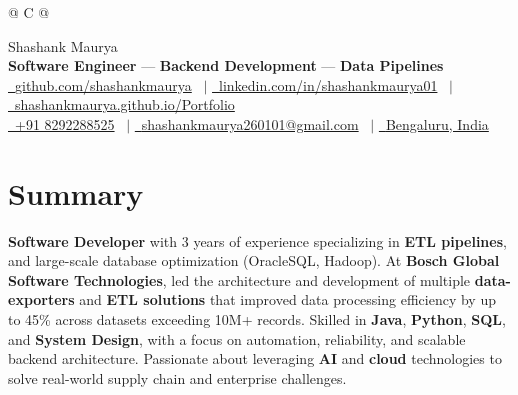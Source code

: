 \documentclass[a4paper,10pt]{article}
\begin{document}
\pagestyle{empty}


\begin{tabularx}{\linewidth}{@{} C @{}}

    \Huge{Shashank Maurya}                                                                                                   \\[4.5pt]
    \large\textbf{Software Engineer} --- \textbf{Backend Development} --- \textbf{Data Pipelines}                      \\[7.5pt]

    \href{https://github.com/shashankmaurya}{\faGithub\ \textcolor{linkcolour}{github.com/shashankmaurya}} \ $|$
    \href{https://www.linkedin.com/in/shashankmaurya01/}{\faLinkedin\ \textcolor{linkcolour}{linkedin.com/in/shashankmaurya01}} \ $|$
    \href{https://shashankmaurya.github.io/Portfolio/}{\faGlobe\ \textcolor{linkcolour}{shashankmaurya.github.io/Portfolio}} \\[2pt]
    \href{tel:8292288525}{\faMobile \ \textcolor{linkcolour}{+91 8292288525}} \ $|$
    \href{mailto:shashankmaurya260101@gmail.com}{\faEnvelope \ \textcolor{linkcolour}{shashankmaurya260101@gmail.com}} \ $|$
    \href{https://maps.app.goo.gl/1jdNXAY2RCsecJSLA}{\faMapMarker\ \textcolor{linkcolour}{Bengaluru, India}}                 \\
\end{tabularx}

\section{Summary}
\noindent\textbf{Software Developer} with 3 years of experience specializing in \textbf{ETL pipelines}, and large-scale database optimization (OracleSQL, Hadoop). At \textbf{Bosch Global Software Technologies}, led the architecture and development of multiple \textbf{data-exporters} and \textbf{ETL solutions} that improved data processing efficiency by up to 45\% across datasets exceeding 10M+ records. Skilled in \textbf{Java}, \textbf{Python}, \textbf{SQL}, and \textbf{System Design}, with a focus on automation, reliability, and scalable backend architecture. Passionate about leveraging \textbf{AI} and \textbf{cloud} technologies to solve real-world supply chain and enterprise challenges.
\end{document}
